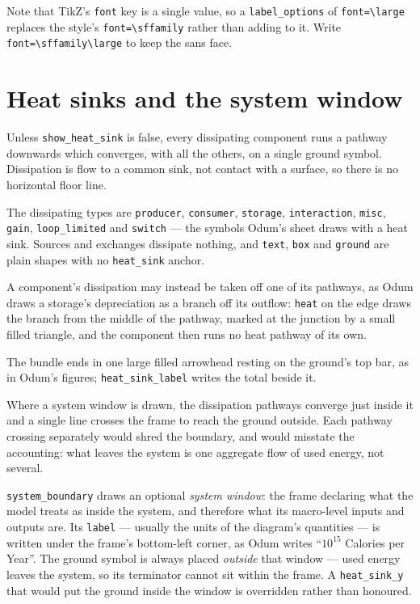 \documentclass{article}
\begin{document}
Note that TikZ's \texttt{font} key is a single value, so a
\texttt{label\_options} of \verb|font=\large| replaces the style's
\verb|font=\sffamily| rather than adding to it. Write
\verb|font=\sffamily\large| to keep the sans face.

\section{Heat sinks and the system window}

Unless \texttt{show\_heat\_sink} is false, every dissipating component runs a
pathway downwards which converges, with all the others, on a single ground
symbol. Dissipation is flow to a common sink, not contact with a surface, so
there is no horizontal floor line.

The dissipating types are \texttt{producer}, \texttt{consumer},
\texttt{storage}, \texttt{interaction}, \texttt{misc}, \texttt{gain},
\texttt{loop\_limited} and \texttt{switch} --- the symbols Odum's sheet draws
with a heat sink. Sources and exchanges dissipate nothing, and \texttt{text},
\texttt{box} and \texttt{ground} are plain shapes with no \texttt{heat\_sink}
anchor.

A component's dissipation may instead be taken off one of its pathways, as Odum
draws a storage's depreciation as a branch off its outflow: \texttt{heat} on the
edge draws the branch from the middle of the pathway, marked at the junction by
a small filled triangle, and the component then runs no heat pathway of its own.

The bundle ends in one large filled arrowhead resting on the ground's top bar,
as in Odum's figures; \texttt{heat\_sink\_label} writes the total beside it.

Where a system window is drawn, the dissipation pathways converge just inside it
and a single line crosses the frame to reach the ground outside. Each pathway
crossing separately would shred the boundary, and would misstate the accounting:
what leaves the system is one aggregate flow of used energy, not several.

\texttt{system\_boundary} draws an optional \emph{system window}: the frame
declaring what the model treats as inside the system, and therefore what its
macro-level inputs and outputs are. Its \texttt{label} --- usually the units of
the diagram's quantities --- is written under the frame's bottom-left corner, as
Odum writes ``$10^{15}$ Calories per Year''. The ground symbol is always placed
\emph{outside} that window --- used energy leaves the system, so its terminator
cannot sit within the frame. A \texttt{heat\_sink\_y} that would put the ground
inside the window is overridden rather than honoured.
\end{document}
